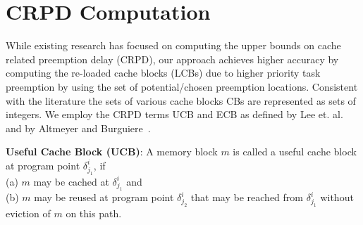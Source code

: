 \section{CRPD Computation}\label{sec:crpd_computation}

While existing research has focused on computing the upper bounds on cache related preemption delay (CRPD), our approach achieves higher accuracy by computing the re-loaded cache blocks (LCBs) due to higher priority task preemption by using the set of potential/chosen preemption locations.  Consistent with the literature the sets of various cache blocks CBs are represented as sets of integers.  We employ the CRPD terms UCB and ECB as defined by Lee et. al.~\cite{lee:98} and by Altmeyer and Burguiere~\cite{altmeyer:11c}.

\begin{definition}
\textbf{Useful Cache Block (UCB)}: A memory block $m$ is called a useful cache block at program point \begin{math}\delta_{j_{1}}^{i}\end{math}, if \\(a) $m$ may be cached at \begin{math}\delta_{j_{1}}^{i}\end{math} and \\(b) $m$ may be reused at program point \begin{math}\delta_{j_{2}}^{i}\end{math} that may be reached from \begin{math}\delta_{j_{1}}^{i}\end{math} without eviction of $m$ on this path.
\end{definition}

